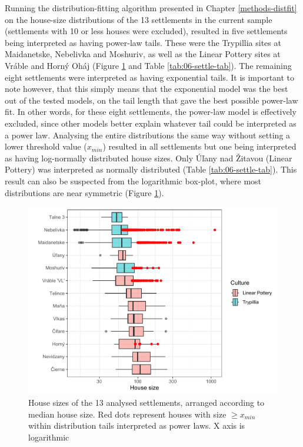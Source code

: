 \documentclass[
  12pt,
  a4paper, twoside]{book}
\begin{document}
Running the distribution-fitting algorithm presented in Chapter \ref{methods-distfit} on the house-size distributions of the 13 settlements in the current sample (settlements with 10 or less houses were excluded), resulted in five settlements being interpreted as having power-law tails. These were the Trypillia sites at Maidanetske, Nebelivka and Moshuriv, as well as the Linear Pottery sites at Vráble and Horný Oháj (Figure \ref{fig:06-settle-box} and Table \ref{tab:06-settle-tab}). The remaining eight settlements were interpreted as having exponential tails. It is important to note however, that this simply means that the exponential model was the best out of the tested models, on the tail length that gave the best possible power-law fit. In other words, for these eight settlements, the power-law model is effectively excluded, since other models better explain whatever tail could be interpreted as a power law. Analysing the entire distributions the same way without setting a lower threshold value (\(x_{min}\)) resulted in all settlements but one being interpreted as having log-normally distributed house sizes. Only Úľany nad Žitavou (Linear Pottery) was interpreted as normally distributed (Table \ref{tab:06-settle-tab}). This result can also be suspected from the logarithmic box-plot, where most distributions are near symmetric (Figure \ref{fig:06-settle-box}).



\begin{figure}

{\centering \includegraphics[width=0.9\linewidth]{bookdown-demo_files/figure-latex/06-settle-box-1} 

}

\caption[House sizes, settlements]{House sizes of the 13 analysed settlements, arranged according to median house size. Red dots represent houses with size \(\geq x_{min}\) within distribution tails interpreted as power laws. X axis is logarithmic}\label{fig:06-settle-box}
\end{figure}
\end{document}
